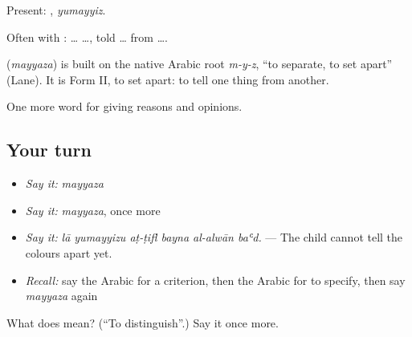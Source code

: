 Present: , \emph{yumayyiz}.

Often with :   …  …, told … from ….

\begin{cousinweb}
\textbf{} (\emph{mayyaza}) is built on the native Arabic root \emph{m-y-z}, \textquotedblleft{}to separate, to set apart\textquotedblright{} (Lane). It is Form II, to set apart: to tell one thing from another.
\end{cousinweb}

\begin{grammarlens}[title={What you've built}]
One more word for giving reasons and opinions.
\end{grammarlens}

\subsection*{Your turn}
\begin{itemize}
\raggedright
  \item \emph{Say it:} \emph{mayyaza}
  \item \emph{Say it:} \emph{mayyaza}, once more
  \item \emph{Say it:} \emph{lā yumayyizu aṭ-ṭifl bayna al-alwān baʿd.} — The child cannot tell the colours apart yet.
  \item \emph{Recall:} say the Arabic for a criterion, then the Arabic for to specify, then say \emph{mayyaza} again
\end{itemize}

\begin{tcolorbox}[breakable,colback=teal!4,colframe=teal!35!black,title={Before you move on}]
What does  mean? (\textquotedblleft{}To distinguish\textquotedblright{}.) Say it once more.
\end{tcolorbox}
